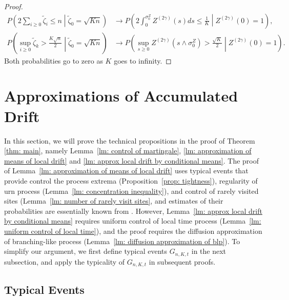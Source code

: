 \documentclass[twoside,12pt, a4paper]{article}
\numberwithin{equation}{section}
\theoremstyle{remark}
\begin{document}
\begin{proof}
\begin{align*}
	P\left( 2 \sum_{i \ge  0} \tilde \zeta_i \le  n \middle| \tilde\zeta_0 = \sqrt{K n} \right) 
	&\to 
	P\left(2 \int _0^{\sigma_0^{Z}} Z^{(2 \gamma)}(s) d s \le \frac{1}{K} \middle| Z^{(2 \gamma)}(0) = 1 \right),\\
	P\left( \sup _{i \ge 0} \tilde \zeta_k > \frac{K \sqrt{n} }{2} \middle| \tilde \zeta_0 = \sqrt{K n}   \right)
	&\to 
	P\left( \sup_{s \ge 0} Z^{(2 \gamma)}(s \wedge \sigma_0^{Z}) > \frac{\sqrt{K} }{2} \middle| Z^{(2 \gamma)} (0) = 1 \right) 
.\end{align*} 
Both probabilities go to zero as $K$ goes to infinity. 
\end{proof}

		
		
\section{Approximations of Accumulated Drift}\label{sec: approximations}

	In this section, we will prove the technical propositions in the proof of Theorem \ref{thm: main}, namely Lemma~\ref{lm: control of martingale}, \ref{lm: approximation of means of local drift} and \ref{lm: approx local drift by conditional means}. 
	The proof of Lemma~\ref{lm: approximation of means of local drift} uses typical events that provide control the process extrema (Proposition~\ref{prop: tightness}), regularity of urn process (Lemma~\ref{lm: concentration inequality}), and control of rarely visited sites (Lemma~\ref{lm: number of rarely visit sites}, and estimates of their probabilities are essentially known from \cite{KMP23}. 
	However, Lemma~\ref{lm: approx local drift by conditional means} requires uniform control of local time process (Lemma~\ref{lm: uniform control of local time}), and the proof requires the diffusion approximation of branching-like process (Lemma~\ref{lm: diffusion approximation of blp}).
	To simplify our argument, we first define typical events $G_{n, K, t}$ in the next subsection, and apply the typicality of $G_{n, K, t}$ in subsequent proofs.

		\subsection{Typical Events}
		
\end{document}
